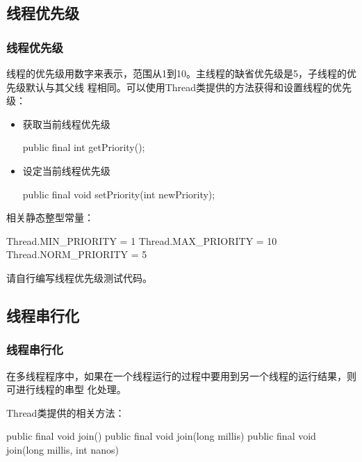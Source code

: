 \subsection{线程优先级}

\begin{frame}[fragile] %
  \frametitle{线程优先级}

  线程的优先级用数字来表示，范围从1到10。主线程的缺省优先级是5，子线程的优先级默认与其父线
  程相同。可以使用Thread类提供的方法获得和设置线程的优先级：

  \begin{itemize}\kai
  \item 获取当前线程优先级
    \begin{javaCode}
      public final int getPriority();
    \end{javaCode}
  \item 设定当前线程优先级
    \begin{javaCode}
      public final void setPriority(int newPriority);
    \end{javaCode}
  \end{itemize}
  相关静态整型常量：
  \begin{javaCode}
    Thread.MIN_PRIORITY = 1
    Thread.MAX_PRIORITY = 10
    Thread.NORM_PRIORITY = 5
  \end{javaCode}

   请自行编写线程优先级测试代码。
  
\end{frame}

\subsection{线程串行化}

\begin{frame}[fragile] %
\frametitle{线程串行化}

在多线程程序中，如果在一个线程运行的过程中要用到另一个线程的运行结果，则可进行线程的{\hei\Red 串型
化}处理。

Thread类提供的相关方法：

\begin{javaCode}
public final void join()
public final void join(long millis)
public final void join(long millis, int nanos)
\end{javaCode}

\end{frame}

